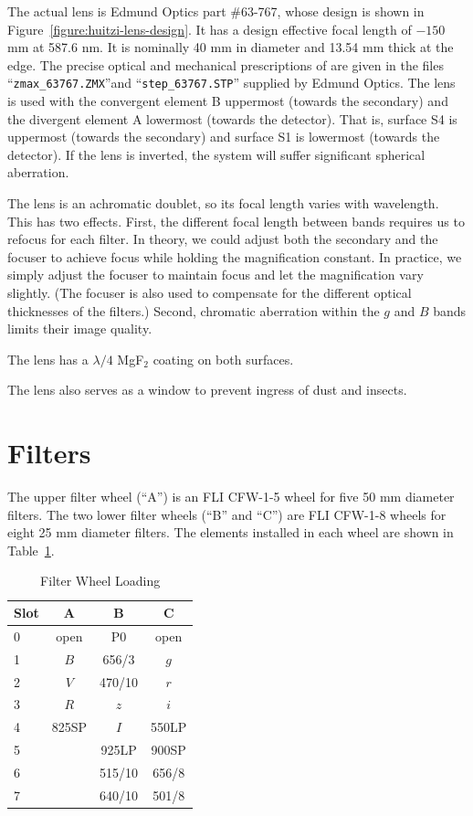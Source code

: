 The actual lens is Edmund Optics part \#63-767, whose design is shown in Figure~\ref{figure:huitzi-lens-design}. It has a design effective focal length of $-150$ mm at 587.6 nm. It is nominally 40 mm in diameter and 13.54 mm thick at the edge. The precise optical and mechanical prescriptions of are given in the files “\verb|zmax_63767.ZMX|”and “\verb|step_63767.STP|” supplied by Edmund Optics. The lens is used with the convergent element B uppermost (towards the secondary) and the divergent element A lowermost (towards the detector). That is, surface S4 is uppermost (towards the secondary) and surface S1 is lowermost (towards the detector). If the lens is inverted, the system will suffer significant spherical aberration.

The lens is an achromatic doublet, so its focal length varies with wavelength. This has two effects. First, the different focal length between bands requires us to refocus for each filter. In theory, we could adjust both the secondary and the focuser to achieve focus while holding the magnification constant. In practice, we simply adjust the focuser to maintain focus and let the magnification vary slightly. (The focuser is also used to compensate for the different optical thicknesses of the filters.) Second, chromatic aberration within the $g$ and $B$ bands limits their image quality.

The lens has a $\lambda/4$ MgF$_2$ coating on both surfaces.

The lens also serves as a window to prevent ingress of dust and insects.

\section{Filters}

The upper filter wheel (“A”) is an FLI CFW-1-5 wheel for five 50 mm diameter filters. The two lower filter wheels (“B” and “C”) are FLI CFW-1-8 wheels for eight 25 mm diameter filters. The elements installed in each wheel are shown in Table~\ref{table:filter-wheel-loading}.

\begin{table}
\begin{center}
\caption{Filter Wheel Loading}
\label{table:filter-wheel-loading}
\medskip
\begin{tabular}{lccc}
\hline
Slot&A&B&C\\
\hline
0&open	&P0			&open		\\
1&$B$	&656/3		&$g$		\\
2&$V$	&470/10		&$r$		\\
3&$R$	&$z$			&$i$		\\
4&825SP	&$I$			&550LP	\\
5&			&925LP		&900SP	\\
6&			&515/10		&656/8	\\
7&			&640/10		&501/8	\\
\hline
\end{tabular}
\end{center}
\end{table}

